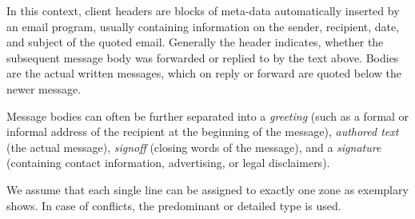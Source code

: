 \documentclass{llncs}
\begin{document}
In this context, client headers are blocks of meta-data automatically inserted by an email program, usually containing information on the sender, recipient, date, and subject of the quoted email.
Generally the header indicates, whether the subsequent message body was forwarded or replied to by the text above.
Bodies are the actual written messages, which on reply or forward are quoted below the newer message.

Message bodies can often be further separated into a \textit{greeting} (such as a formal or informal address of the recipient at the beginning of the message), \textit{authored text} (the actual message), \textit{signoff} (closing words of the message), and a \textit{signature} (containing contact information, advertising, or legal disclaimers).

We assume that each single line can be assigned to exactly one zone as  exemplary shows.
In case of conflicts, the predominant or detailed type is used.


\end{document}
